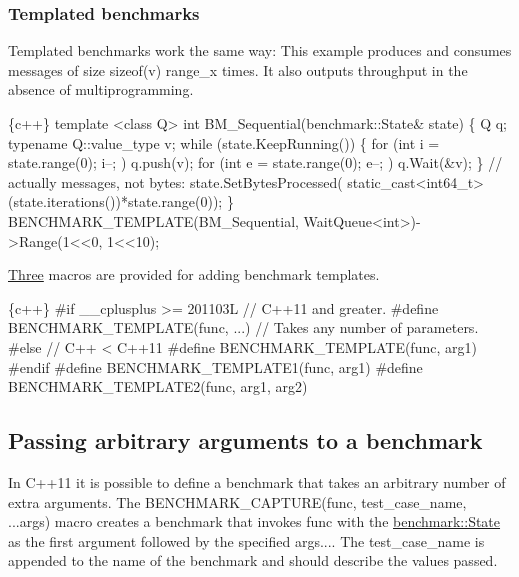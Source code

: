 \subsubsection*{Templated benchmarks}

Templated benchmarks work the same way\+: This example produces and consumes messages of size {\ttfamily sizeof(v)} {\ttfamily range\+\_\+x} times. It also outputs throughput in the absence of multiprogramming.


\begin{DoxyCode}
\{c++\}
template <class Q> int BM\_Sequential(benchmark::State& state) \{
  Q q;
  typename Q::value\_type v;
  while (state.KeepRunning()) \{
    for (int i = state.range(0); i--; )
      q.push(v);
    for (int e = state.range(0); e--; )
      q.Wait(&v);
  \}
  // actually messages, not bytes:
  state.SetBytesProcessed(
      static\_cast<int64\_t>(state.iterations())*state.range(0));
\}
BENCHMARK\_TEMPLATE(BM\_Sequential, WaitQueue<int>)->Range(1<<0, 1<<10);
\end{DoxyCode}


\mbox{\hyperlink{struct_three}{Three}} macros are provided for adding benchmark templates.


\begin{DoxyCode}
\{c++\}
#if \_\_cplusplus >= 201103L // C++11 and greater.
#define BENCHMARK\_TEMPLATE(func, ...) // Takes any number of parameters.
#else // C++ < C++11
#define BENCHMARK\_TEMPLATE(func, arg1)
#endif
#define BENCHMARK\_TEMPLATE1(func, arg1)
#define BENCHMARK\_TEMPLATE2(func, arg1, arg2)
\end{DoxyCode}


\subsection*{Passing arbitrary arguments to a benchmark}

In C++11 it is possible to define a benchmark that takes an arbitrary number of extra arguments. The {\ttfamily B\+E\+N\+C\+H\+M\+A\+R\+K\+\_\+\+C\+A\+P\+T\+U\+RE(func, test\+\_\+case\+\_\+name, ...args)} macro creates a benchmark that invokes {\ttfamily func} with the {\ttfamily \mbox{\hyperlink{classbenchmark_1_1_state}{benchmark\+::\+State}}} as the first argument followed by the specified {\ttfamily args...}. The {\ttfamily test\+\_\+case\+\_\+name} is appended to the name of the benchmark and should describe the values passed.

